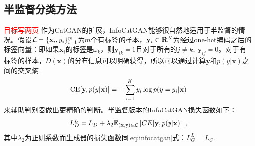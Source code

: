 \subsection{半监督分类方法}\label{sec:ss-infocatgan}
\textcolor{red}{目标写两页}
作为CatGAN的扩展，InfoCatGAN能够很自然地适用于半监督的情况。假设$\mathcal{L} = \{\mathbf{x}_i, y_i\}_{i=1}^m$为$m$个有标签的样本，$\mathbf{y}_i \in \mathbf{R}^K$为经过one-hot编码之后的标签向量：即如果$\mathbf{x}_i$的标签是$\omega_k$，则$\mathbf{y}_{ik}=1$且对于所有的$j\neq k,~\mathbf{y}_{ij} = 0$。对于有标签的样本，$D(\mathbf{x})$的分布信息可以明确获得，所以可以通过计算$\mathbf{y}$和$p(y|\mathbf{x})$之间的交叉熵：
\begin{equation}
  \label{eq:celoss}
  \text{CE}[\mathbf{y}, p(y|\mathbf{x})] = -\sum_{i=1}^K y_i \log p(y=y_i | \mathbf{x})
\end{equation}
来辅助判别器做出更精确的判断。半监督版本的InfoCatGAN损失函数如下：
\begin{equation}
  L_D^L = L_D + \lambda_2 \mathbb{E}_{(\mathbf{x}, \mathbf{y}) \in \mathcal{L}}\left[ CE[\mathbf{y}, p(y|\mathbf{x})] \right],
\end{equation}
其中$\lambda_2$为正则系数而生成器的损失函数同\eqref{eq:infocatgan}式：$L_G^L = L_G$.


